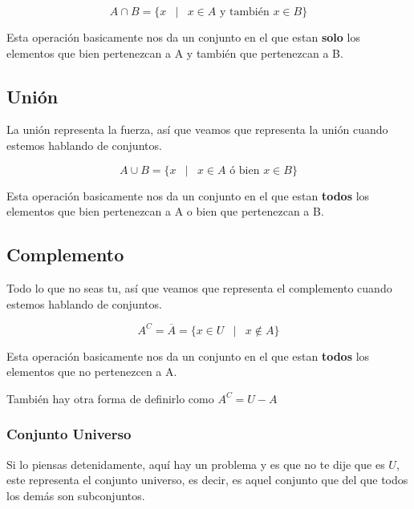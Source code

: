 \documentclass[12pt]{report}                                    %
\DeclareMathOperator \Space {\quad}                             %
\DeclareMathOperator \MiniSpace {\;}                            %
\newcommand \Such {\MiniSpace|\MiniSpace}                       %
\begin{document}
            \begin{equation}
                A \cap B = \{ x \Such x \in A \text{ y también } x \in B \}
            \end{equation}

            Esta operación basicamente nos da un conjunto en el que estan \textbf{solo} los elementos
            que bien pertenezcan a A y también que pertenezcan a B.


        \clearpage
        \subsection{Unión}

            La unión representa la fuerza, así que veamos que representa la unión cuando estemos
            hablando de conjuntos.

            \begin{equation}
                A \cup B = \{ x \Such x \in A \text{ ó bien } x \in B \}
            \end{equation}

            Esta operación basicamente nos da un conjunto en el que estan \textbf{todos} los elementos
            que bien pertenezcan a A o bien que pertenezcan a B.


        \clearpage
        \subsection{Complemento}

            Todo lo que no seas tu, así que veamos que representa el complemento cuando estemos
            hablando de conjuntos.

            \begin{equation}
                A^C = \overline A = \{ x \in U \Such x \notin A \}
            \end{equation}

            Esta operación basicamente nos da un conjunto en el que estan \textbf{todos} los elementos
            que no pertenezcen a A.

            También hay otra forma de definirlo como $A^C = U - A$

            \subsubsection{Conjunto Universo}
                Si lo piensas detenidamente, aquí hay un problema y es que no te dije que es $U$, este
                representa el conjunto universo, es decir, es aquel conjunto que del que todos los demás
                son subconjuntos.
\end{document}
